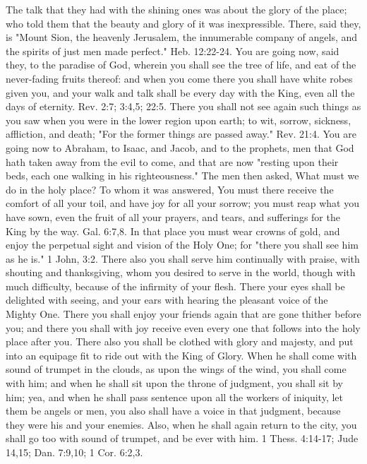 The talk that they had with the shining ones was about the glory of the
place; who told them that the beauty and glory of it was inexpressible.
There, said they, is "Mount Sion, the heavenly Jerusalem, the
innumerable company of angels, and the spirits of just men made
perfect." Heb. 12:22-24. You are going now, said they, to the paradise
of God, wherein you shall see the tree of life, and eat of the
never-fading fruits thereof: and when you come there you shall have
white robes given you, and your walk and talk shall be every day with
the King, even all the days of eternity. Rev. 2:7; 3:4,5; 22:5. There
you shall not see again such things as you saw when you were in the
lower region upon earth; to wit, sorrow, sickness, affliction, and
death; "For the former things are passed away." Rev. 21:4. You are
going now to Abraham, to Isaac, and Jacob, and to the prophets, men
that God hath taken away from the evil to come, and that are now
"resting upon their beds, each one walking in his righteousness." The
men then asked, What must we do in the holy place? To whom it was
answered, You must there receive the comfort of all your toil, and have
joy for all your sorrow; you must reap what you have sown, even the
fruit of all your prayers, and tears, and sufferings for the King by
the way. Gal. 6:7,8. In that place you must wear crowns of gold, and
enjoy the perpetual sight and vision of the Holy One; for "there you
shall see him as he is." 1 John, 3:2. There also you shall serve him
continually with praise, with shouting and thanksgiving, whom you
desired to serve in the world, though with much difficulty, because of
the infirmity of your flesh. There your eyes shall be delighted with
seeing, and your ears with hearing the pleasant voice of the Mighty
One. There you shall enjoy your friends again that are gone thither
before you; and there you shall with joy receive even every one that
follows into the holy place after you. There also you shall be clothed
with glory and majesty, and put into an equipage fit to ride out with
the King of Glory. When he shall come with sound of trumpet in the
clouds, as upon the wings of the wind, you shall come with him; and
when he shall sit upon the throne of judgment, you shall sit by him;
yea, and when he shall pass sentence upon all the workers of iniquity,
let them be angels or men, you also shall have a voice in that
judgment, because they were his and your enemies. Also, when he shall
again return to the city, you shall go too with sound of trumpet, and
be ever with him. 1 Thess. 4:14-17; Jude 14,15; Dan. 7:9,10; 1 Cor.
6:2,3.

